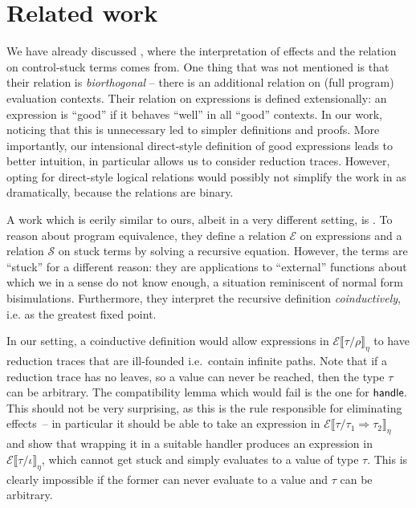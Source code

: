 \documentclass[a4paper, 12pt]{report}
\newcommand{\keyword}[1]{\textsf{\textup{#1}}}
\newcommand{\Handle}{\keyword{handle}\;}
\newcommand{\E}{\mathcal{E}}
\renewcommand{\S}{\mathcal{S}}
\newcommand{\+}{\enspace}
\begin{document}
\section{Related work}

We have already discussed \cite{hwc}, where the interpretation of effects
and the relation on control-stuck terms comes from.
One thing that was not mentioned is that their relation is {\em biorthogonal}
– there is an additional relation on (full program) evaluation contexts.
Their relation on expressions is defined extensionally:
an expression is ``good'' if it behaves ``well'' in all ``good'' contexts.
In our work, noticing that this is unnecessary led to simpler definitions and proofs.
More importantly, our intensional direct-style definition of good expressions leads to
better intuition, in particular allows us to consider reduction traces.
However, opting for direct-style logical relations would possibly not simplify the work
in \cite{hwc} as dramatically,
because the relations are binary.

A work which is eerily similar to ours, albeit in a very different setting, is \cite{marriage}.
To reason about program equivalence,
they define a relation $\E$ on expressions
and a relation $\S$ on stuck terms
by solving a recursive equation.
However, the terms are ``stuck'' for a different reason:
they are applications to ``external'' functions about which we in a sense do not know enough,
a situation reminiscent of normal form bisimulations.
Furthermore, they interpret the recursive definition {\em coinductively},
i.e. as the greatest fixed point.

In our setting, a coinductive definition would allow
expressions in $\E⟦τ/ρ⟧_η$ to have reduction traces that are ill-founded
i.e.\ contain infinite paths.
Note that if a reduction trace has no leaves, so a value can never be reached,
then the type $τ$ can be arbitrary.
The compatibility lemma which would fail is the one for $\Handle\!\!$.
This should not be very surprising,
as this is the rule responsible for eliminating effects –
in particular it should be able to take
an expression in $\E⟦τ/τ_1 \Rightarrow τ_2⟧_η$ and show that wrapping it in a
suitable handler produces an expression in $\E⟦τ/ι⟧_η$, which cannot get
stuck and simply evaluates to a value of type $τ$.
This is clearly impossible if
the former can never evaluate to a value and $τ$ can be arbitrary.
\end{document}
